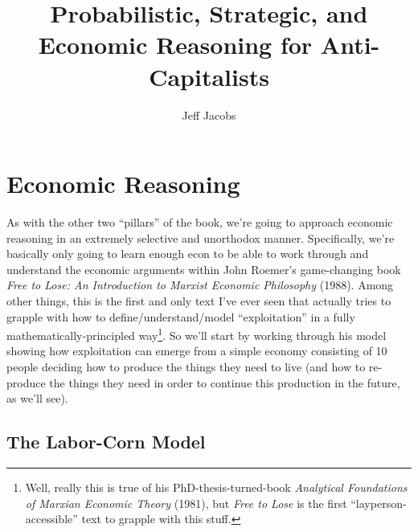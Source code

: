 \documentclass[12pt]{article}
\title{Probabilistic, Strategic, and Economic Reasoning for Anti-Capitalists}
\author{Jeff Jacobs}
\begin{document}
\maketitle

\doublespacing

\section{Economic Reasoning}

As with the other two ``pillars'' of the book, we're going to approach economic reasoning in an extremely selective and unorthodox manner. Specifically, we're basically only going to learn enough econ to be able to work through and understand the economic arguments within John Roemer's game-changing book \textit{Free to Lose: An Introduction to Marxist Economic Philosophy} (1988). Among other things, this is the first and only text I've ever seen that actually tries to grapple with how to define/understand/model ``exploitation'' in a fully mathematically-principled way\footnote{Well, really this is true of his PhD-thesis-turned-book \textit{Analytical Foundations of Marxian Economic Theory} (1981), but \textit{Free to Lose} is the first ``layperson-accessible'' text to grapple with this stuff.}. So we'll start by working through his model showing how exploitation can emerge from a simple economy consisting of 10 people deciding how to produce the things they need to live (and how to re-produce the things they need in order to continue this production in the future, as we'll see).

\subsection{The Labor-Corn Model}
\end{document}
